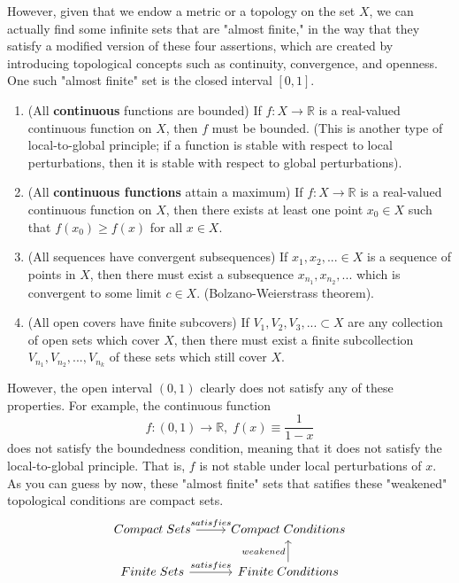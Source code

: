     However, given that we endow a metric or a topology on the set $X$, we can actually find some infinite sets that are "almost finite," in the way that they satisfy a modified version of these four assertions, which are created by introducing topological concepts such as continuity, convergence, and openness. One such "almost finite" set is the closed interval $[0,1]$. 
    \begin{enumerate}
        \item (All \textbf{continuous} functions are bounded) If $f: X \longrightarrow \mathbb{R}$ is a real-valued continuous function on $X$, then $f$ must be bounded. (This is another type of local-to-global principle; if a function is stable with respect to local perturbations, then it is stable with respect to global perturbations).
        \item (All \textbf{continuous functions} attain a maximum) If $f: X \longrightarrow \mathbb{R}$ is a real-valued continuous function on $X$, then there exists at least one point $x_0 \in X$ such that $f(x_0) \geq f(x)$ for all $x \in X$. 
        \item (All sequences have convergent subsequences) If $x_1, x_2, ... \in X$ is a sequence of points in $X$, then there must exist a subsequence $x_{n_1}, x_{n_2}, ...$ which is convergent to some limit $c \in X$. (Bolzano-Weierstrass theorem).
        \item (All open covers have finite subcovers) If $V_1, V_2, V_3, ... \subset X$ are any collection of open sets which cover $X$, then there must exist a finite subcollection $V_{n_1}, V_{n_2}, ..., V_{n_k}$ of these sets which still cover $X$. 
    \end{enumerate}

    However, the open interval $(0,1)$ clearly does not satisfy any of these properties. For example, the continuous function 
    \[f: (0,1) \longrightarrow \mathbb{R}, \; f(x) \equiv \frac{1}{1-x}\]
    does not satisfy the boundedness condition, meaning that it does not satisfy the local-to-global principle. That is, $f$ is not stable under local perturbations of $x$. As you can guess by now, these "almost finite" sets that satifies these "weakened" topological conditions are compact sets. 
    \[\begin{tikzcd}
    Compact \;Sets \arrow{r}{satisfies} & Compact \;Conditions \\
    Finite \;Sets \arrow{r}{satisfies} & Finite \;Conditions \arrow{u}{weakened}
    \end{tikzcd}\]

